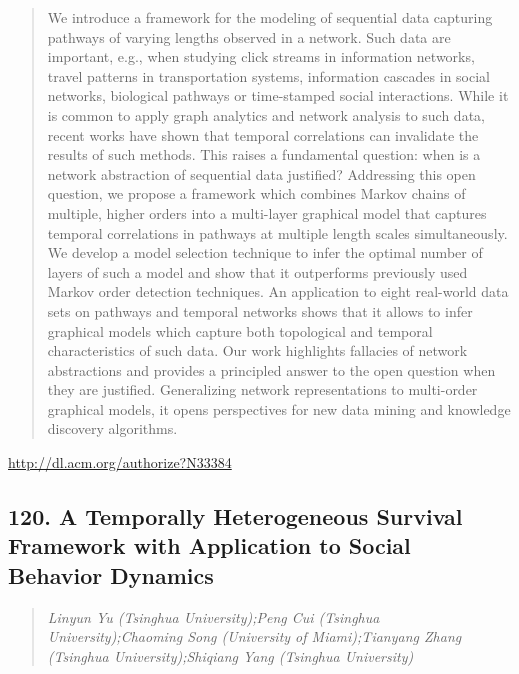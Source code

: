 \documentclass{article}
\begin{document}
\begin{quote}
We introduce a framework for the modeling of sequential data capturing pathways of varying lengths observed in a network. Such data are important, e.g., when studying click streams in information networks, travel patterns in transportation systems, information cascades in social networks, biological pathways or time-stamped social interactions. While it is common to apply graph analytics and network analysis to such data, recent works have shown that temporal correlations can invalidate the results of such methods. This raises a fundamental question: when is a network abstraction of sequential data justified? Addressing this open question, we propose a framework which combines Markov chains of multiple, higher orders into a multi-layer graphical model that captures temporal correlations in pathways at multiple length scales simultaneously. We develop a model selection technique to infer the optimal number of layers of such a model and show that it outperforms previously used Markov order detection techniques. An application to eight real-world data sets on pathways and temporal networks shows that it allows to infer graphical models which capture both topological and temporal characteristics of such data. Our work highlights fallacies of network abstractions and provides a principled answer to the open question when they are justified. Generalizing network representations to multi-order graphical models, it opens perspectives for new data mining and knowledge discovery algorithms.
\end{quote}

\href{http://dl.acm.org/authorize?N33384}{http://dl.acm.org/authorize?N33384}

\subsection{120. A Temporally Heterogeneous Survival Framework with Application to Social Behavior Dynamics}

\begin{quote}
\footnotesize{\textit{Linyun Yu (Tsinghua University);Peng Cui (Tsinghua University);Chaoming Song (University of Miami);Tianyang Zhang (Tsinghua University);Shiqiang Yang (Tsinghua University)}}

\end{quote}
\end{document}

